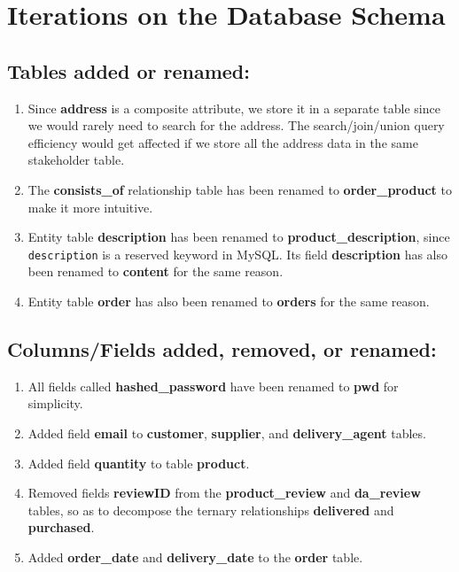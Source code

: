 \documentclass[12pt]{report}
\begin{document}
    \section*{\Huge Iterations on the Database Schema}
    \subsection*{Tables added or renamed:}
    \begin{enumerate}
        \item
        Since \textbf{address} is a composite attribute, we store it in a separate table since we would rarely need to search for the address.
        The search/join/union query efficiency would get affected if we store all the address data in the same stakeholder table.
        \item
        The \textbf{consists\_of} relationship table has been renamed to \textbf{order\_product} to make it more intuitive.
        \item
        Entity table \textbf{description} has been renamed to \textbf{product\_description}, since \texttt{description} is a reserved keyword in MySQL.
        Its field \textbf{description} has also been renamed to \textbf{content} for the same reason.
        \item
        Entity table \textbf{order} has also been renamed to \textbf{orders} for the same reason.
    \end{enumerate}

    \subsection*{Columns/Fields added, removed, or renamed:}
    \begin{enumerate}
        \item
        All fields called \textbf{hashed\_password} have been renamed to \textbf{pwd} for simplicity.
        \item
        Added field \textbf{email} to \textbf{customer}, \textbf{supplier}, and \textbf{delivery\_agent} tables.
        \item
        Added field \textbf{quantity} to table \textbf{product}.
        \item
        Removed fields \textbf{reviewID} from the \textbf{product\_review} and \textbf{da\_review} tables, so as to decompose the ternary relationships \textbf{delivered} and \textbf{purchased}.
        \item
        Added \textbf{order\_date} and \textbf{delivery\_date} to the \textbf{order} table.
    \end{enumerate}
\end{document}
